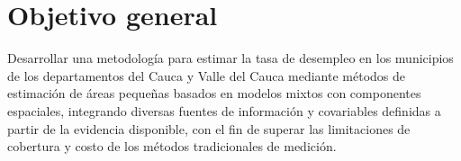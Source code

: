 



\label{sec:objetivos}

\section{Objetivo general}
Desarrollar una metodología para estimar la tasa de desempleo en los municipios de los departamentos del Cauca y Valle del Cauca mediante métodos de estimación de áreas pequeñas basados en modelos mixtos con componentes espaciales, integrando diversas fuentes de información y covariables definidas a partir de la evidencia disponible, con el fin de superar las limitaciones de cobertura y costo de los métodos tradicionales de medición.
